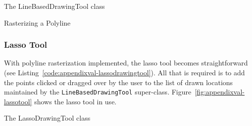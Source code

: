 \begin{stulisting}[p]
\caption{The LineBasedDrawingTool class}
\label{code:appendixval-linebaseddrawingtool}

\end{stulisting}

\begin{stulisting}[p]
\caption{Rasterizing a Polyline}
\label{code:appendixval-rasterizepolyline}

\end{stulisting}

\subsubsection{Lasso Tool}

With polyline rasterization implemented, the lasso tool becomes straightforward (see Listing~\ref{code:appendixval-lassodrawingtool}). All that is required is to add the points clicked or dragged over by the user to the list of drawn locations maintained by the \texttt{LineBasedDrawingTool} super-class. Figure~\ref{fig:appendixval-lassotool} shows the lasso tool in use.

\begin{stulisting}[p]
\caption{The LassoDrawingTool class}
\label{code:appendixval-lassodrawingtool}

\end{stulisting}

